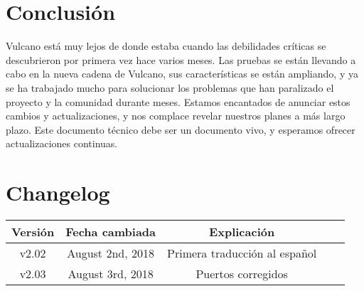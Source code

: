 \documentclass[A4paper, 12pt]{article}
\begin{document}
\section{Conclusión}
Vulcano está muy lejos de donde estaba cuando las debilidades críticas se descubrieron por primera vez hace varios meses. Las pruebas se están llevando a cabo en la nueva cadena de Vulcano, sus características se están ampliando, y ya se ha trabajado mucho para solucionar los problemas que han paralizado el proyecto y la comunidad durante meses.   Estamos encantados de anunciar estos cambios y actualizaciones, y nos complace revelar nuestros planes a más largo plazo. Este documento técnico debe ser un documento vivo, y esperamos ofrecer actualizaciones continuas.

\newpage
\section{Changelog}

\begin{table}[h]
\centering
\begin{tabular}{@{}ccccc@{}}
\toprule
Versión & Fecha cambiada & Explicación \\ \midrule
v2.02 & August 2nd, 2018 & Primera traducción al español \\
v2.03 & August 3rd, 2018 & Puertos corregidos \\
 \bottomrule
\end{tabular}
\end{table}
\end{document}
